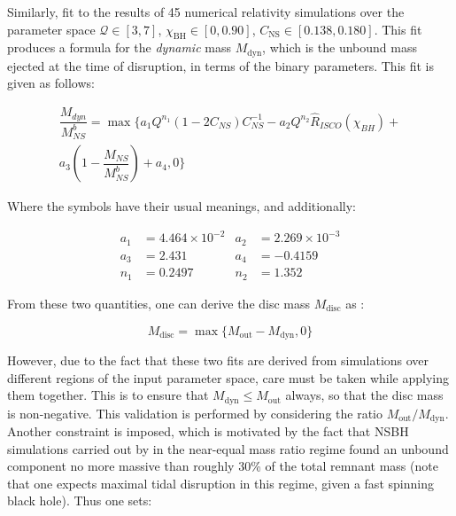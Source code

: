     Similarly, \cite{kawaguchi_2016} fit to the results of 45 numerical relativity
    simulations over the parameter space $\mathcal{Q} \in [3,7]$, $\chi_{\mathrm{BH}}
    \in [0, 0.90]$, $C_{\mathrm{NS}} \in [0.138, 0.180]$. This fit produces a formula
    for the \textit{dynamic} mass $M_{\mathrm{dyn}}$, which is the unbound mass ejected
    at the time of disruption, in terms of the binary parameters. This fit is given as
    follows:

    \begin{multline}
        \dfrac{M_{dyn}}{M_{NS}^b} =
            \max \biggl\{
               a_1 Q^{n_1}(1 - 2C_{NS})C^{-1}_{NS} -
               a_2 Q^{n_2} \hat{R}_{ISCO}(\chi_{BH}) + \\
               a_3\left(1 - \dfrac{M_{NS}}{M^b_{NS}}\right) +
               a_4, 0
           \biggr\}
    \end{multline}

    Where the symbols have their usual meanings, and additionally:

    \begin{align*}
        a_1 &= 4.464 \times 10^{-2} & a_2 &= 2.269 \times 10^{-3} \\
        a_3 &= 2.431 & a_4 &= -0.4159 \\
        n_1 &= 0.2497 & n_2 &= 1.352
    \end{align*}

    From these two quantities, one can derive the disc mass $M_{\mathrm{disc}}$ as :

    \begin{equation}
        M_{\mathrm{disc}} = \max\{M_{\mathrm{out}} - M_{\mathrm{dyn}}, 0\}
        \label{eq:disc_mass}
    \end{equation}

    However, due to the fact that these two fits are derived from simulations over
    different regions of the input parameter space, care must be taken while applying
    them together. This is to ensure that $M_{\mathrm{dyn}} \leq M_{\mathrm{out}}$
    always, so that the disc mass is non-negative. This validation is performed by
    considering the ratio $M_{\mathrm{out}} / M_{\mathrm{dyn}}$. Another constraint is
    imposed, which is motivated by the fact that NSBH simulations carried out by
    \cite{foucart_2019} in the near-equal mass ratio regime found an unbound component
    no more massive than roughly 30\% of the total remnant mass (note that one expects
    maximal tidal disruption in this regime, given a fast spinning black hole). Thus one
    sets:

